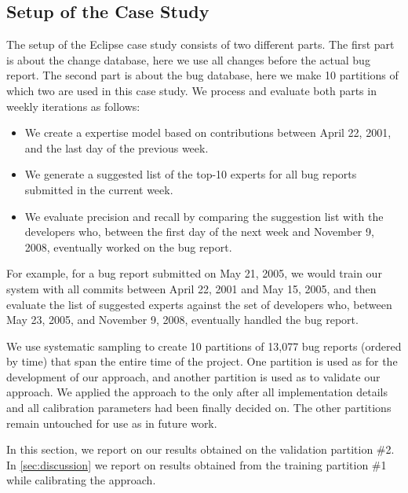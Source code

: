 \subsection{Setup of the Case Study}

The setup of the Eclipse case study consists of two different parts. The first part is about the change database, here we use all changes before the actual bug report. The second part is about the bug database, here we make 10 partitions of which two are used in this case study. We process and evaluate  both parts in weekly iterations as follows:
\begin{itemize}
\item We create a \DEVLECT expertise model based on contributions between April 22, 2001, and the last day of the previous week.
\item We generate a suggested list of the top-10 experts for all bug reports submitted in the current week.
\item We evaluate precision and recall by comparing the suggestion list with the developers who, between the first day of the next week and November 9, 2008, eventually worked on the bug report.
\end{itemize}

For example, for a bug report submitted on May 21, 2005, we would train our system with all commits between April 22, 2001 and May 15, 2005, and then evaluate the list of suggested experts against the set of developers who, between May 23, 2005, and November 9, 2008, eventually handled the bug report.

We use systematic sampling to create 10 partitions of 13,077 bug reports (ordered by time) that span the entire time of the project. One partition is used as \trainingset for the development of our approach, and another partition is used as \validationset to validate our approach. We applied the approach to the \validationset only after all implementation details and all calibration parameters had been finally decided on. The other partitions remain untouched for use as \validationset in future work.

In this section, we report on our results obtained on the validation partition \#2. In \autoref{sec:discussion} we report on results obtained from the training partition \#1 while calibrating the approach.


